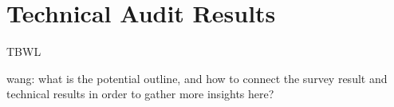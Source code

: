 \documentclass[conference,compsoc]{IEEEtran}
\newcommand{\xw}[1] {{\color{red}wang: #1}}
\begin{document}
\section{Technical Audit Results}
\label{sec:audit-results}
TBWL

\xw{what is the potential outline, and how to connect the survey result and technical results in order to gather more insights here?}
\end{document}
